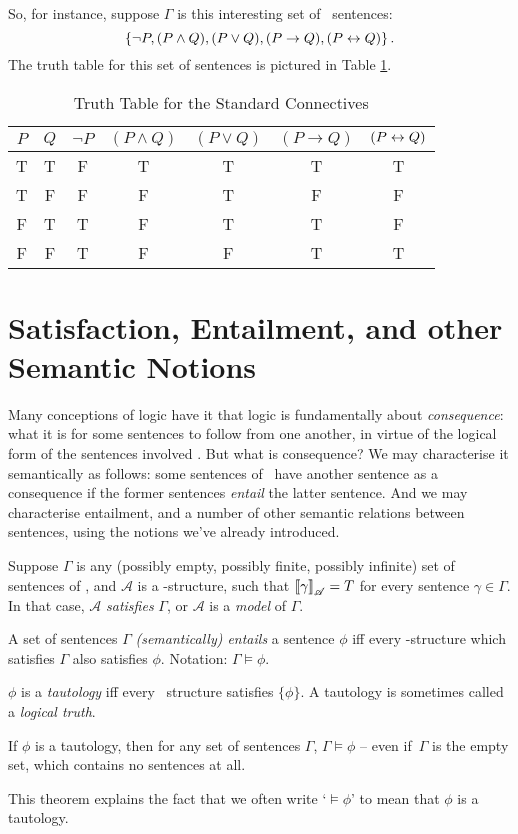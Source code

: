So, for instance, suppose $\Gamma$ is this interesting set of \lone\ sentences: $$\left\{\neg P, (P\wedge Q), (P\vee Q), (P \to Q), (P\leftrightarrow Q)\right\}.$$ The truth table for this set of sentences is pictured in Table \ref{tt}. 

\begin{table}[t]
	\centering
	\begin{tabular}{cc|ccccc}
\toprule
$P$ & $Q$ & $\neg P$ & $(P\wedge Q)$ & $(P\vee Q)$ & $(P \to Q)$ & $(P\leftrightarrow Q)$	\\
\midrule
T & T & F & T & T & T & T \\
T & F & F & F & T & F & F \\
F & T & T & F & T & T & F \\
F & F & T & F & F & T & T \\
\bottomrule
	\end{tabular}
	\caption{Truth Table for the Standard Connectives\label{tt}}
\end{table}


\section{Satisfaction, Entailment, and other Semantic Notions}

Many conceptions of logic have it that logic is fundamentally about \emph{consequence}: what it is for some sentences to follow from one another, in virtue of the logical form of the sentences involved \citep{brlc}. But what is consequence? We may characterise it semantically as follows: some sentences of \lone\ have another sentence as a consequence if the former sentences \emph{entail} the latter sentence. And we may characterise entailment, and a number of other semantic relations between sentences, using the notions we've already introduced.
\begin{definition}[Satisfaction]
	Suppose $\Gamma$ is any (possibly empty, possibly finite, possibly infinite) set of sentences of \lone, and $\mathscr{A}$ is a \lone-structure, such that $\left\llbracket \gamma\right\rrbracket_{\mathscr{A}}=T$ for every sentence $\gamma\in\Gamma$. In that case, $\mathscr{A}$ \emph{satisfies} $\Gamma$, or $\mathscr{A}$ is a \emph{model} of $\Gamma$.	
	\end{definition}
\begin{definition}[Entailment]
	A set of sentences $\Gamma$ \emph{(semantically) entails} a sentence $\phi$ iff every \lone-structure which satisfies $\Gamma$ also satisfies $\phi$. Notation: $\Gamma \vDash \phi$.
\end{definition}
\begin{definition}[Tautology]		
	$\phi$ is a \emph{tautology} iff every \lone\ structure satisfies $\{\phi\}$. A tautology is sometimes called a \emph{logical truth}. 
\end{definition}
\begin{theorem}
	If $\phi$ is a tautology, then for any set of sentences $\Gamma$, $\Gamma \vDash \phi$ – even if \,$\Gamma$ is the empty set, which contains no sentences at all.
\end{theorem}
This theorem explains the fact that we often write `$\vDash \phi$' to mean that $\phi$ is a tautology.

